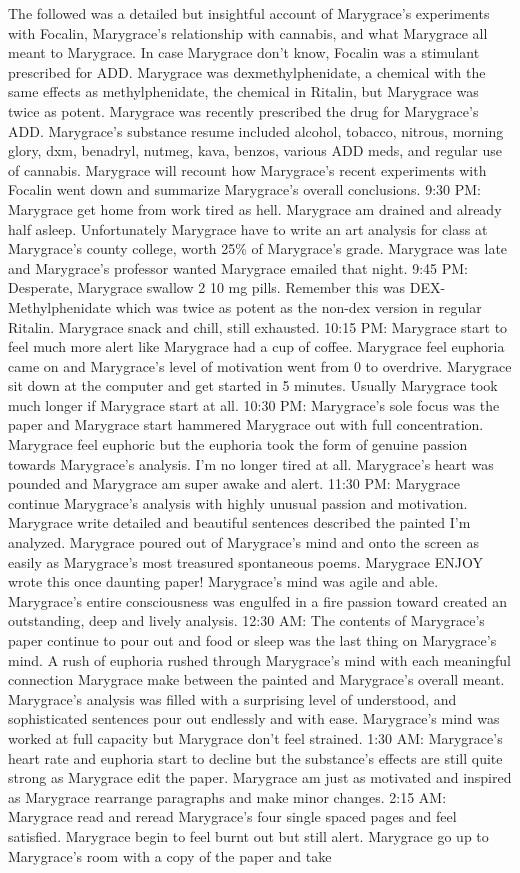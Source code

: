 \documentclass[12pt]{book}
\begin{document}
The followed was a detailed but insightful account of Marygrace's experiments with Focalin, Marygrace's relationship with cannabis, and what Marygrace all meant to Marygrace. In case Marygrace don't know, Focalin was a stimulant prescribed for ADD. Marygrace was dexmethylphenidate, a chemical with the same effects as methylphenidate, the chemical in Ritalin, but Marygrace was twice as potent. Marygrace was recently prescribed the drug for Marygrace's ADD. Marygrace's substance resume included alcohol, tobacco, nitrous, morning glory, dxm, benadryl, nutmeg, kava, benzos, various ADD meds, and regular use of cannabis. Marygrace will recount how Marygrace's recent experiments with Focalin went down and summarize Marygrace's overall conclusions. 9:30 PM: Marygrace get home from work tired as hell. Marygrace am drained and already half asleep. Unfortunately Marygrace have to write an art analysis for class at Marygrace's county college, worth 25\% of Marygrace's grade. Marygrace was late and Marygrace's professor wanted Marygrace emailed that night. 9:45 PM: Desperate, Marygrace swallow 2 10 mg pills. Remember this was DEX-Methylphenidate which was twice as potent as the non-dex version in regular Ritalin. Marygrace snack and chill, still exhausted. 10:15 PM: Marygrace start to feel much more alert like Marygrace had a cup of coffee. Marygrace feel euphoria came on and Marygrace's level of motivation went from 0 to overdrive. Marygrace sit down at the computer and get started in 5 minutes. Usually Marygrace took much longer if Marygrace start at all. 10:30 PM: Marygrace's sole focus was the paper and Marygrace start hammered Marygrace out with full concentration. Marygrace feel euphoric but the euphoria took the form of genuine passion towards Marygrace's analysis. I'm no longer tired at all. Marygrace's heart was pounded and Marygrace am super awake and alert. 11:30 PM: Marygrace continue Marygrace's analysis with highly unusual passion and motivation. Marygrace write detailed and beautiful sentences described the painted I'm analyzed. Marygrace poured out of Marygrace's mind and onto the screen as easily as Marygrace's most treasured spontaneous poems. Marygrace ENJOY wrote this once daunting paper! Marygrace's mind was agile and able. Marygrace's entire consciousness was engulfed in a fire passion toward created an outstanding, deep and lively analysis. 12:30 AM: The contents of Marygrace's paper continue to pour out and food or sleep was the last thing on Marygrace's mind. A rush of euphoria rushed through Marygrace's mind with each meaningful connection Marygrace make between the painted and Marygrace's overall meant. Marygrace's analysis was filled with a surprising level of understood, and sophisticated sentences pour out endlessly and with ease. Marygrace's mind was worked at full capacity but Marygrace don't feel strained. 1:30 AM: Marygrace's heart rate and euphoria start to decline but the substance's effects are still quite strong as Marygrace edit the paper. Marygrace am just as motivated and inspired as Marygrace rearrange paragraphs and make minor changes. 2:15 AM: Marygrace read and reread Marygrace's four single spaced pages and feel satisfied. Marygrace begin to feel burnt out but still alert. Marygrace go up to Marygrace's room with a copy of the paper and take 
\end{document}
